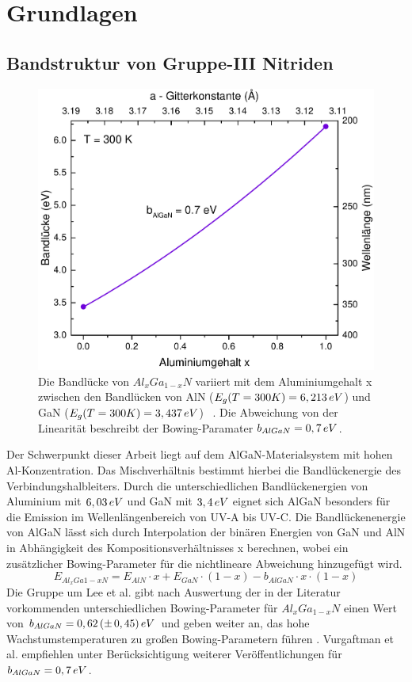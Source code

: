 \chapter{Grundlagen}
\thispagestyle{fancy}

\section{Bandstruktur von Gruppe-III Nitriden}
\begin{figure}[!htb]
    \centering
    \begin{minipage}[t]{\linewidth}
        \centering
        \includegraphics[width=0.5\linewidth]{Bilder/bandluecke.pdf}
        \caption{Die Bandlücke von $Al_{x}Ga_{1-x}N$ variiert mit dem Aluminiumgehalt x zwischen den Bandlücken von AlN ($E_{g}(T = 300 K) = 6,213 \thinspace eV$) und GaN ($E_{g}(T = 300 K) = 3,437 \thinspace  eV$) ~\cite{pipr}. Die Abweichung von der Linearität beschreibt der Bowing-Paramater $b_{AlGaN} = 0,7 \thinspace eV$.} 
        \label{fig:wurtz}
    \end{minipage}%
\end{figure}
\noindent
Der Schwerpunkt dieser Arbeit liegt auf dem AlGaN-Materialsystem mit hohen Al-Konzentration. Das Mischverhältnis bestimmt hierbei die Bandlückenergie des Verbindungshalbleiters. Durch die unterschiedlichen Bandlückenergien von Aluminium mit $6,03 \thinspace eV$\cite{fenaln} und GaN mit $3,4 \thinspace eV$ \cite{pipr} eignet sich AlGaN besonders für die Emission im Wellenlängenbereich von UV-A bis UV-C. 
Die Bandlückenenergie von AlGaN lässt sich durch Interpolation der binären Energien von GaN und AlN in Abhängigkeit des Kompositionsverhältnisses x berechnen, wobei ein zusätzlicher Bowing-Parameter für die nichtlineare Abweichung hinzugefügt wird. 
%
\begin{equation}
    E_{Al_{x}Ga{1-x}N} = E_{AlN} \cdot x + E_{GaN} \cdot (1-x) - b_{AlGaN} \cdot x \cdot (1-x) 
\end{equation}
%
Die Gruppe um Lee et al. gibt nach Auswertung der in der Literatur vorkommenden unterschiedlichen Bowing-Parameter für $Al_{x}Ga_{1-x}N$ einen Wert von $b_{AlGaN} = 0,62\thinspace(\pm \thinspace 0,45)\thinspace eV$ und geben weiter an, das hohe Wachstumstemperaturen zu großen Bowing-Parametern führen \cite{doi:10.1063/1.123339}.
Vurgaftman et al. empfiehlen unter Berücksichtigung weiterer Veröffentlichungen für $b_{AlGaN} =  0,7 \thinspace eV$.



